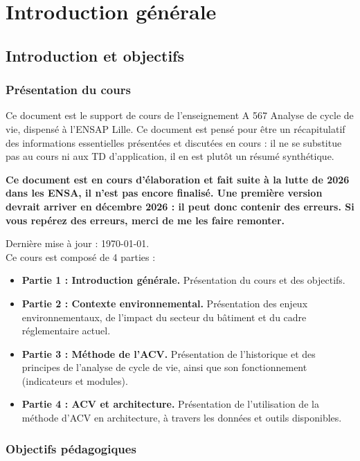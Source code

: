 \part{Introduction générale}

\chapter{Introduction et objectifs}

\section{Présentation du cours}
Ce document est le support de cours de l'enseignement A 567 Analyse de cycle de vie, dispensé à l'ENSAP Lille. Ce document est pensé pour être un récapitulatif des informations essentielles présentées et discutées en cours : il ne se substitue pas au cours ni aux TD d'application, il en est plutôt un résumé synthétique.

\textbf{Ce document est en cours d'élaboration et fait suite à la lutte de 2026 dans les ENSA, il n'est pas encore finalisé. Une première version devrait arriver en décembre 2026 : il peut donc contenir des erreurs. Si vous repérez des erreurs, merci de me les faire remonter.}

Dernière mise à jour : \today.\\

Ce cours est composé de 4 parties :
\begin{itemize}
  \item \textbf{Partie 1 : Introduction générale.} Présentation du cours et des objectifs.
  \item \textbf{Partie 2 : Contexte environnemental.} Présentation des enjeux environnementaux, de l'impact du secteur du bâtiment et du cadre réglementaire actuel.
  \item \textbf{Partie 3 : Méthode de l'ACV.} Présentation de l'historique et des principes de l'analyse de cycle de vie, ainsi que son fonctionnement (indicateurs et modules).
  \item \textbf{Partie 4 : ACV et architecture.} Présentation de l'utilisation de la méthode d'ACV en architecture, à travers les données et outils disponibles.
\end{itemize}

\section{Objectifs pédagogiques}

